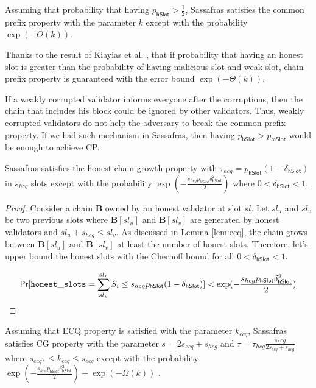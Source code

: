 \begin{lemma}[CP]
	Assuming that probability that having  $ p_{\mathsf{hSlot}} >\frac{1}{2}$, Sassafras satisfies the common prefix property  with the parameter $ k $ except with the probability  $ \exp(-\Theta(k)) $. 
\end{lemma}

Thanks to the result of  Kiayias et al. \cite{consistency}, that if probability that having an honest slot is greater than the probability of having malicious slot and weak slot, chain prefix property is guaranteed with the error bound $ \exp(-\Theta(k)) $.

If a weakly corrupted validator informs everyone after the corruptions, then the chain that includes his block could be ignored by other validators. Thus, weakly corrupted validators do not help the adversary to break the common prefix property. If we had such mechanism in Sassafras, then having $ p_{\mathsf{hSlot}}  > p_{\mathsf{mSlot}} $ would be enough to achieve CP. 


\begin{lemma}[HCG]
	Sassafras satisfies the honest chain growth property with $ \tau_{hcg} = p_{\mathsf{hSlot}}(1-\delta_{\mathsf{hSlot}})  $ in $ s_{hcg} $ slots except with the probability $ \exp(-\frac{s_{hcg}p_{\mathsf{hSlot}}\delta_{\mathsf{hSlot}}^2}{2}) $ where $ 0< \delta_{\mathsf{hSlot}} < 1 $.
\end{lemma}

\begin{proof}
	Consider a chain $ \mathbf{B} $ owned by an honest validator at slot $ sl $. Let $ sl_u $ and $ sl_v $ be two previous slots where $ \mathbf{B}[sl_u] $ and $ \mathbf{B}[sl_v] $ are generated by honest validators and $ sl_u + s_{hcg} \leq sl_v $. As discussed in  Lemma \ref{lem:ecq}, the chain grows between $ \mathbf{B}[sl_u] $ and $ \mathbf{B}[sl_v] $ at least the number of honest slots. Therefore, let's upper bound the honest slots with the Chernoff bound for all $ 0<\delta_{\mathsf{hSlot}}<1 $.
	
	\begin{equation}
	\mathsf{Pr}[\mathtt{honest\_slots} = \sum_{sl_u}^{sl_v}S_i \leq s_{hcg} p_{\mathsf{hSlot}}(1-\delta_{\mathsf{hSlot}})] < \exp(-\frac{s_{hcg}p_{\mathsf{hSlot}}\delta_{\mathsf{hSlot}}^2}{2})
	\end{equation}
	
	
\end{proof}


\begin{lemma}[CG]
	Assuming that ECQ property is satisfied with the parameter $ k_{ecq}  $, Sassafras satisfies CG property with the parameter $ s = 2s_{ecq} + s_{hcg} $ and $ \tau =  \tau_{hcg} \frac{s_hcg}{2 s_{ecq} + s_{hcg}}   $ where $ s_{ecq} \tau  \leq k_{ecq} \leq s_{ecq} $ except with the probability $ \exp(-\frac{s_{hcg}p_{\mathsf{hSlot}}\delta_{\mathsf{hSlot}}^2}{2}) +  \exp(-\Omega(k)) $ .
\end{lemma}

